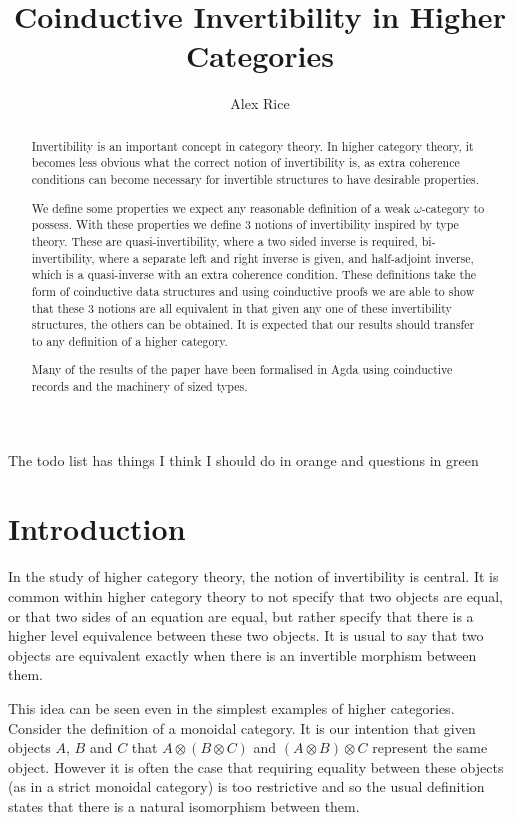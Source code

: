 \documentclass{article}
\title{Coinductive Invertibility in Higher Categories}
\author{Alex Rice}
\theoremstyle{definition}
\theoremstyle{remark}
\begin{document}
\maketitle

The todo list has things I think I should do in orange and questions in green
\listoftodos{}

\begin{abstract}
  Invertibility is an important concept in category theory. In higher category theory, it becomes less obvious what the correct notion of invertibility is, as extra coherence conditions can become necessary for invertible structures to have desirable properties.

  We define some properties we expect any reasonable definition of a weak \(\omega\)-category to possess. With these properties we define 3 notions of invertibility inspired by type theory. These are quasi-invertibility, where a two sided inverse is required, bi-invertibility, where a separate left and right inverse is given, and half-adjoint inverse, which is a quasi-inverse with an extra coherence condition. These definitions take the form of coinductive data structures and using coinductive proofs we are able to show that these 3 notions are all equivalent in that given any one of these invertibility structures, the others can be obtained. It is expected that our results should transfer to any definition of a higher category.

  Many of the results of the paper have been formalised in Agda using coinductive records and the machinery of sized types.
\end{abstract}
\section{Introduction}\label{sec:intro}

In the study of higher category theory, the notion of invertibility is central. It is common within higher category theory to not specify that two objects are equal, or that two sides of an equation are equal, but rather specify that there is a higher level equivalence between these two objects. It is usual to say that two objects are equivalent exactly when there is an invertible morphism between them.

This idea can be seen even in the simplest examples of higher categories. Consider the definition of a monoidal category. It is our intention that given objects \(A\), \(B\) and \(C\) that \(A \otimes (B \otimes C)\) and \((A \otimes B) \otimes C\) represent the same object. However it is often the case that requiring equality between these objects (as in a strict monoidal category) is too restrictive and so the usual definition states that there is a natural isomorphism between them.
\end{document}
